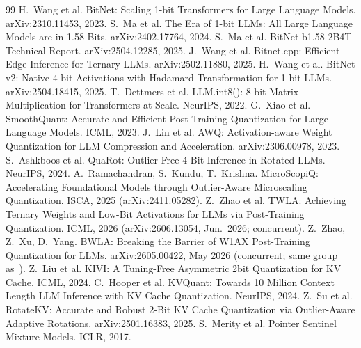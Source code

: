 \documentclass[11pt]{article}
\begin{document}

\begin{thebibliography}{99}
 H.~Wang et al. BitNet: Scaling 1-bit Transformers for Large
Language Models. arXiv:2310.11453, 2023.
 S.~Ma et al. The Era of 1-bit LLMs: All Large Language Models are
in 1.58 Bits. arXiv:2402.17764, 2024.
 S.~Ma et al. BitNet b1.58 2B4T Technical Report.
arXiv:2504.12285, 2025.
 J.~Wang et al. Bitnet.cpp: Efficient Edge Inference for
Ternary LLMs. arXiv:2502.11880, 2025.
 H.~Wang et al. BitNet v2: Native 4-bit Activations with
Hadamard Transformation for 1-bit LLMs. arXiv:2504.18415, 2025.
 T.~Dettmers et al. LLM.int8(): 8-bit Matrix
Multiplication for Transformers at Scale. NeurIPS, 2022.
 G.~Xiao et al. SmoothQuant: Accurate and Efficient
Post-Training Quantization for Large Language Models. ICML, 2023.
 J.~Lin et al. AWQ: Activation-aware Weight Quantization for LLM
Compression and Acceleration. arXiv:2306.00978, 2023.
 S.~Ashkboos et al. QuaRot: Outlier-Free 4-Bit Inference
in Rotated LLMs. NeurIPS, 2024.
 A.~Ramachandran, S.~Kundu, T.~Krishna.
MicroScopiQ: Accelerating Foundational Models through Outlier-Aware Microscaling
Quantization. ISCA, 2025 (arXiv:2411.05282).
 Z.~Zhao et al. TWLA: Achieving Ternary Weights and Low-Bit
Activations for LLMs via Post-Training Quantization. ICML, 2026 (arXiv:2606.13054,
Jun.\ 2026; concurrent).
 Z.~Zhao, Z.~Xu, D.~Yang. BWLA: Breaking the Barrier of W1AX
Post-Training Quantization for LLMs. arXiv:2605.00422, May 2026 (concurrent; same
group as~\cite{li2026twla}).
 Z.~Liu et al. KIVI: A Tuning-Free Asymmetric 2bit Quantization
for KV Cache. ICML, 2024.
 C.~Hooper et al. KVQuant: Towards 10 Million Context
Length LLM Inference with KV Cache Quantization. NeurIPS, 2024.
 Z.~Su et al. RotateKV: Accurate and Robust 2-Bit KV Cache
Quantization via Outlier-Aware Adaptive Rotations. arXiv:2501.16383, 2025.
 S.~Merity et al. Pointer Sentinel Mixture Models. ICLR,
2017.
\end{thebibliography}
\end{document}
